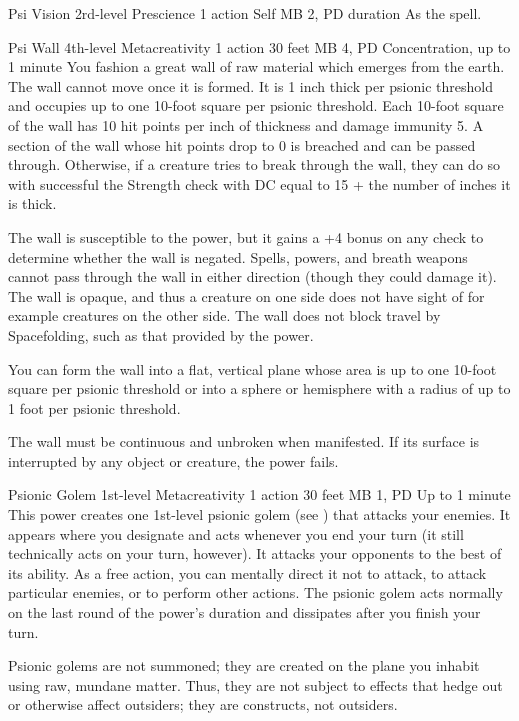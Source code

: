 \DndPowerHeader%
  {Psi Vision}
  {2rd-level Prescience}
  {1 action}
  {Self}
  {MB 2, PD \lvltwo}
  {duration}
As the  spell.

\DndPowerHeader%
  {Psi Wall}
  {4th-level Metacreativity}
  {1 action}
  {30 feet}
  {MB 4, PD \lvlfour}
  {Concentration, up to 1 minute}
You fashion a great wall of raw material which emerges from the earth.
The wall cannot move once it is formed.
It is 1 inch thick per psionic threshold
and occupies up to one 10-foot square per psionic threshold.
Each 10-foot square of the wall has 10 hit points per inch of thickness
and damage immunity 5.
A section of the wall whose hit points drop to 0 is breached
and can be passed through.
Otherwise, if a creature tries to break through the wall,
they can do so with successful the Strength check with
DC equal to 15 + the number of inches it is thick.

The wall is susceptible to the  power,
but it gains a +4 bonus on any check
to determine whether the wall is negated.
Spells, powers, and breath weapons cannot pass through the wall
in either direction
(though they could damage it).
The wall is opaque, and thus a creature on one side does not have
sight of for example creatures on the other side.
The wall does not block travel by Spacefolding,
such as that provided by the  power.
  
You can form the wall into a flat, vertical plane
whose area is up to one 10-foot square per psionic threshold
or into a sphere or hemisphere
with a radius of up to 1 foot per psionic threshold.
  
The wall must be continuous and unbroken when manifested.
If its surface is interrupted by any object or creature,
the power fails.

\DndPowerHeader%
  {Psionic Golem}
  {1st-level Metacreativity}
  {1 action}
  {30 feet}
  {MB 1, PD \lvlone}
  {Up to 1 minute}
  This power creates one 1st-level psionic golem
  (see )
  that attacks your enemies.
  It appears where you designate and acts
  whenever you end your turn
  (it still technically acts on your turn, however).
  It attacks your opponents to the best of its ability.
  As a free action,
  you can mentally direct it not to attack,
  to attack particular enemies,
  or to perform other actions.
  The psionic golem acts normally on the last round
  of the power's duration
  and dissipates after you finish your turn.

  Psionic golems are not summoned;
  they are created on the plane you inhabit
  using raw, mundane matter.
  Thus, they are not subject to effects
  that hedge out or otherwise affect outsiders;
  they are constructs, not outsiders.

